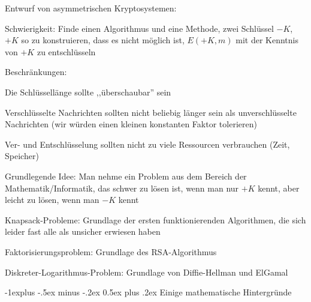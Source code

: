 \documentclass[a4paper]{article}
\makeatletter
\renewcommand{\subsection}{\@startsection{subsection}{2}{0mm}%
 {-1explus -.5ex minus -.2ex}%
 {0.5ex plus .2ex}%
 {\normalfont\normalsize\bfseries}}
\makeatother
\begin{document}
\begin{multicols}{3}
\begin{itemize*}
\begin{itemize*}
            \end{itemize*}
            \item Entwurf von asymmetrischen Kryptosystemen:
            \begin{itemize*}
                  \item Schwierigkeit: Finde einen Algorithmus und eine Methode, zwei Schlüssel $-K$, $+K$ so zu konstruieren, dass es nicht möglich ist, $E(+K, m)$ mit der Kenntnis von $+K$ zu entschlüsseln
                  \item Beschränkungen:
                  \begin{itemize*} \item Die Schlüssellänge sollte ,,überschaubar'' sein \item Verschlüsselte Nachrichten sollten nicht beliebig länger sein als unverschlüsselte Nachrichten (wir würden einen kleinen konstanten Faktor tolerieren) \item Ver- und Entschlüsselung sollten nicht zu viele Ressourcen verbrauchen (Zeit, Speicher) \end{itemize*}
                  \item Grundlegende Idee: Man nehme ein Problem aus dem Bereich der Mathematik/Informatik, das schwer zu lösen ist, wenn man nur $+K$ kennt, aber leicht zu lösen, wenn man $-K$ kennt
                  \begin{itemize*} \item Knapsack-Probleme: Grundlage der ersten funktionierenden Algorithmen, die sich leider fast alle als unsicher erwiesen haben \item Faktorisierungsproblem: Grundlage des RSA-Algorithmus \item Diskreter-Logarithmus-Problem: Grundlage von Diffie-Hellman und ElGamal \end{itemize*}
            \end{itemize*}
      \end{itemize*}


      \subsection{Einige mathematische
            Hintergründe}


\end{multicols}
\end{document}
